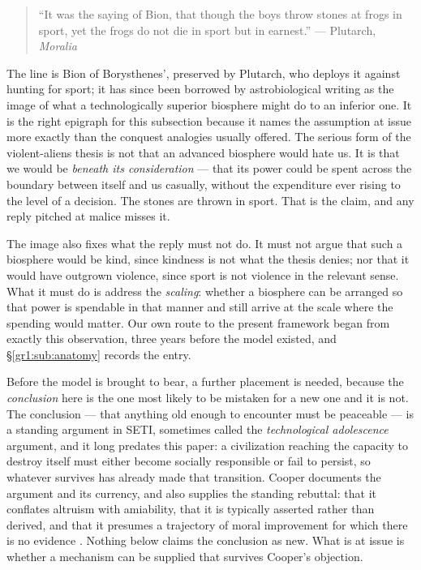 \documentclass[11pt]{article}
\numberwithin{equation}{section}
\theoremstyle{plain}
\theoremstyle{definition}
\theoremstyle{remark}
\begin{document}
\begin{quote}\small
``It was the saying of Bion, that though the boys throw stones at frogs
in sport, yet the frogs do not die in sport but in earnest.''
\hfill --- Plutarch, \emph{Moralia} \cite{Plutarch}
\end{quote}

\noindent The line is Bion of Borysthenes', preserved by Plutarch, who
deploys it against hunting for sport; it has since been borrowed by
astrobiological writing as the image of what a technologically superior
biosphere might do to an inferior one. It is the right epigraph for this
subsection because it names the assumption at issue more exactly than
the conquest analogies usually offered. The serious form of the
violent-aliens thesis is not that an advanced biosphere would hate us.
It is that we would be \emph{beneath its consideration} --- that its
power could be spent across the boundary between itself and us
casually, without the expenditure ever rising to the level of a
decision. The stones are thrown in sport. That is the claim, and any
reply pitched at malice misses it.

The image also fixes what the reply must not do. It must not argue that
such a biosphere would be kind, since kindness is not what the thesis
denies; nor that it would have outgrown violence, since sport is not
violence in the relevant sense. What it must do is address the
\emph{scaling}: whether a biosphere can be arranged so that power is
spendable in that manner and still arrive at the scale where the
spending would matter. Our own route to the present framework
began from exactly this observation, three years before the model
existed, and \S\ref{gr1:sub:anatomy} records the entry.

Before the model is brought to bear, a further placement is needed, because the \emph{conclusion} here is the one most likely to be mistaken
for a new one and it is not. The conclusion --- that anything old enough to encounter must be
peaceable --- is a standing argument in SETI, sometimes called the
\emph{technological adolescence} argument, and it long predates this
paper: a civilization reaching the capacity to destroy itself must
either become socially responsible or fail to persist, so whatever
survives has already made that transition. Cooper documents the
argument and its currency, and also supplies the standing rebuttal: that
it conflates altruism with amiability, that it is typically asserted
rather than derived, and that it presumes a trajectory of moral
improvement for which there is no evidence \cite{Cooper19}. Nothing
below claims the conclusion as new. What is at issue is whether a
mechanism can be supplied that survives Cooper's objection.
\end{document}

